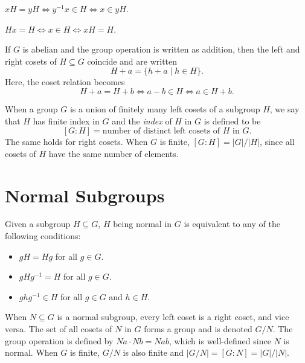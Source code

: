 \begin{corollary}
	$xH = yH \Longleftrightarrow y^{-1}x \in H \Longleftrightarrow x \in yH$.
\end{corollary}

\begin{corollary}
	$Hx = H \Longleftrightarrow x \in H \Longleftrightarrow xH = H$.
\end{corollary}

\begin{notation}
	If $G$ is abelian and the group operation is written as addition, then the
	left and right cosets of $H \subseteq G$ coincide and are written
	\[
		H + a = \{h + a \mid h \in H\}.
	\]
	Here, the coset relation becomes
	\[
		H + a = H + b \Longleftrightarrow a - b \in H \Longleftrightarrow a \in H +
		b.
	\]
\end{notation}

\begin{definition}
	When a group $G$ is a union of finitely many left cosets of a subgroup $H$, we
	say that $H$ has finite index in $G$ and the \emph{index} of $H$ in $G$ is
	defined to be
	\[
		[G : H] = \text{number of distinct left cosets of $H$ in $G$}.
	\]
	The same holds for right cosets. When $G$ is finite, $[G : H] = |G|/|H|$,
	since all cosets of $H$ have the same number of elements.
\end{definition}

\section*{Normal Subgroups}

\begin{theorem}
	Given a subgroup $H \subseteq G$, $H$ being normal in $G$ is equivalent to
	any of the following conditions:
	\begin{itemize}
		\item $gH = Hg$ for all $g \in G$.
		\item $gHg^{-1} = H$ for all $g \in G$.
		\item $ghg^{-1} \in H$ for all $g \in G$ and $h \in H$.
	\end{itemize}
\end{theorem}

\begin{theorem}
	When $N \subseteq G$ is a normal subgroup, every left coset is a right coset,
	and vice versa.  The set of all cosets of $N$ in $G$ forms a group and is
	denoted $G/N$. The group operation is defined by $Na \cdot Nb = Nab$, which is
	well-defined since $N$ is normal. When $G$ is finite, $G/N$ is also finite and
	$|G/N| = [G : N] = |G|/|N|$.
\end{theorem}

